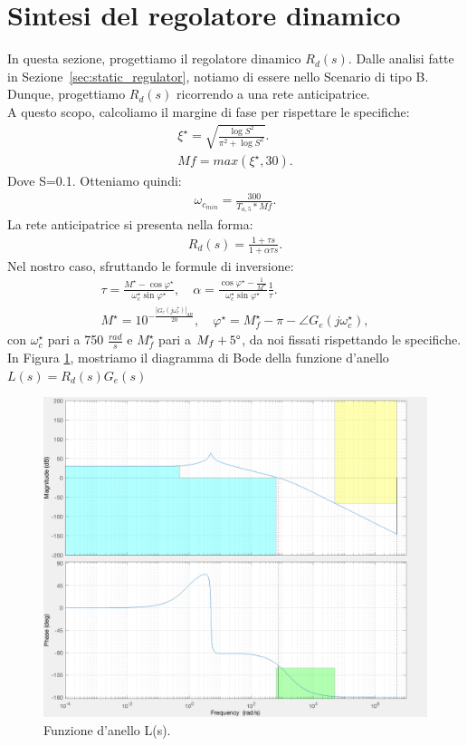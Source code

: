 \documentclass[a4paper, 11pt]{article}
\begin{document}
\section{Sintesi del regolatore dinamico}
\label{sec:dynamic_regulator}

In questa sezione, progettiamo il regolatore dinamico $R_d(s)$. 
%
Dalle analisi fatte in Sezione~\ref{sec:static_regulator}, notiamo di essere nello Scenario di tipo B. Dunque, progettiamo $R_d(s)$ ricorrendo a una rete anticipatrice.\\
A questo scopo, calcoliamo il margine di fase per rispettare le specifiche:
\begin{align}
	\xi^{\star} = \sqrt{\frac{\log{S}^2}{\pi^2 + \log{S}^2}}.
	\\[0.5em]
	Mf = max (\xi^{\star}, 30).
\end{align}
Dove S=0.1. Otteniamo quindi:
\begin{align}
	\omega_{c_{min}}=\frac{300}{T_{a, 5}*Mf}.
\end{align}
La rete anticipatrice si presenta nella forma:
\begin{align}
	R_d(s) = \frac{1+\tau s}{1+\alpha \tau s}.
\end{align}
Nel nostro caso, sfruttando le formule di inversione:
\begin{align}
	\tau = \frac{M^{\star}-\cos{\varphi^{\star}}}{\omega_c^{\star}\sin{\varphi^{\star}}}, \quad
	\alpha = \frac{\cos{\varphi^{\star}-\frac{1}{M^{\star}}}}{\omega_c^{\star}\sin{\varphi^{\star}}}\frac{1}{\tau}.
	\\[1em]
	M^{\star} = 10^{-\frac{\left|G_e(j\omega_c^{\star})\right|_{dB}}{20}}, \quad
	\varphi^{\star} = M_f^{\star} -\pi - \angle{G_e(j\omega_c^{\star})},
\end{align}
con $\omega_c^{\star}$ pari a 750 $\frac{rad}{s}$ e $M_f^{\star}$ pari a $M_f + 5 \degree $, da noi fissati rispettando le specifiche.\\

In Figura \ref{fig:funzione_anello}, mostriamo il diagramma di Bode della funzione d'anello $L(s) = R_d(s) G_e(s)$

\begin{figure}[h!]
	\centering
	\includegraphics[width=0.75\linewidth]{./images/funzione_anello.png}
	\caption{Funzione d'anello L(s).}
	\label{fig:funzione_anello}
\end{figure}
\end{document}
